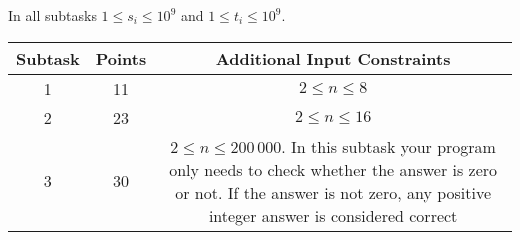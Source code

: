 In all subtasks $1 \le s_i \le 10^9$ and $1 \le t_i \le 10^9$.

\begin{center}
\renewcommand{\arraystretch}{1.5}
\begin{tabular}{|c|c|c|}
\hline
Subtask & Points & Additional Input Constraints\\
\hline
1 & 11 & $2\le n\le 8$ \\
\hline
2 & 23 &  $2\le n\le 16$ \\
\hline
3 & 30 & \parbox{13cm}{\centering \vspace{2mm}$2\le n\le 200\,000$. In this subtask your program only needs to check whether the answer is zero or not. If the answer is not zero, any positive integer answer is considered correct\\\vspace{2mm}} \\
 & 36 & $2\le n\le 200\,000$ \\
\hline
\end{tabular}
\end{center}